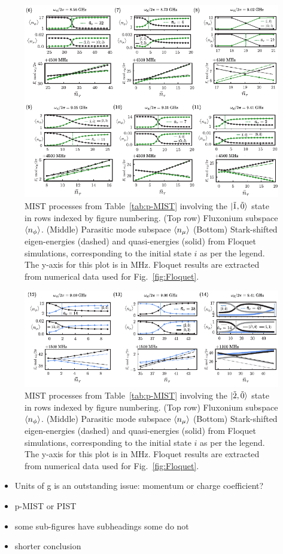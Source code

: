 \documentclass[%
reprint,
superscriptaddress,
 amsmath,amssymb,
 aps,
 prx,
longbibliography,
floatfix,
]{revtex4-2}
\begin{document}
\begin{figure}
    \centering
    \includegraphics[width=1.0\textwidth]{Supp_Fig/Trans1.pdf}
    \caption{MIST processes from Table~\ref{tab:p-MIST} involving the $\ket{\tilde{1},\tilde{0}}$ state in rows indexed by figure numbering. (Top row) Fluxonium subspace $\braket{n_\phi}$. (Middle) Parasitic mode subspace $\braket{n_\mu}$ (Bottom) Stark-shifted eigen-energies (dashed) and quasi-energies (solid) from Floquet simulations, corresponding to the initial state $i$ as per the legend. The y-axis for this plot is in MHz. Floquet results are extracted from numerical data used for Fig.~\ref{fig:Floquet}.}
    \label{fig:Trans1}
\end{figure}
\begin{figure}
    \centering
    \includegraphics[width=1.0\textwidth]{Supp_Fig/Trans2.pdf}
    \caption{MIST processes from Table~\ref{tab:p-MIST} involving the $\ket{\tilde{2},\tilde{0}}$ state in rows indexed by figure numbering. (Top row) Fluxonium subspace $\braket{n_\phi}$. (Middle) Parasitic mode subspace $\braket{n_\mu}$ (Bottom) Stark-shifted eigen-energies (dashed) and quasi-energies (solid) from Floquet simulations, corresponding to the initial state $i$ as per the legend. The y-axis for this plot is in MHz. Floquet results are extracted from numerical data used for Fig.~\ref{fig:Floquet}.}
    \label{fig:Trans2}
\end{figure}

\clearpage
\begin{itemize}
    \item Units of g is an outstanding issue: momentum or charge coefficient?
    \item p-MIST or PIST
    \item some sub-figures have subheadings some do not
    \item shorter conclusion
\end{itemize}
\clearpage
 
\end{document}

